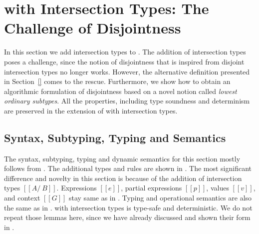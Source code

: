 \section{\cal with Intersection Types: The Challenge of Disjointness}
\label{sec:inter}

In this section we add intersection types to \cal.
The addition of intersection types poses a challenge,
since the notion of disjointness that is inspired from disjoint intersection
types no longer works. However, the alternative definition presented in
Section~\ref{} comes to the rescue. Furthermore, we show how to obtain
an algorithmic formulation of disjointness based on a novel notion
called \emph{lowest ordinary subtypes}. All the properties, including
type soundness and determinism are preserved in the extension of \cal
with intersection types.

\subsection{Syntax, Subtyping, Typing and Semantics}
\label{sec:inter:system}
The syntax, subtyping, typing and dynamic semantics for this section mostly follows
from .  The additional types and rules are shown in
.
The most significant difference and novelty in this section
is because of the addition of intersection types $[[A
    /\ B]]$. Expressions $[[e]]$, partial expressions $[[p]]$, values
$[[v]]$, and context $[[G]]$ stay same as in . Typing
and operational semantics are also the same as in .
\cal with intersection types is type-safe and deterministic. We do not
repeat those lemmas here, since
we have already discussed and shown their form in .

